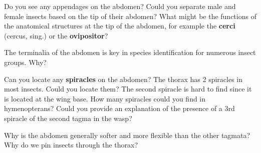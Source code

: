 \documentclass[letterpaper, 11pt]{article}
\begin{document}
\noindent{}Do you see any appendages on the abdomen? Could you separate male and female insects based on the tip of their abdomen? What might be the functions of the anatomical structures at the tip of the abdomen, for example the \textbf{cerci} (cercus, sing.) or the \textbf{ovipositor}? 
\vspace{30 mm}

\noindent{}The terminalia of the abdomen is key in species identification for numerous insect groups. Why? 
\vspace{30 mm}

\noindent{}Can you locate any \textbf{spiracles} on the abdomen? The thorax has 2 spiracles in most insects. Could you locate them? The second spiracle is hard to find since it is located at the wing base. How many spiracles could you find in hymenopterans? Could you provide an explanation of the presence of a 3rd spiracle of the second tagma in the wasp?
\vspace{30 mm}

\noindent{}Why is the abdomen generally softer and more flexible than the other tagmata? Why do we pin insects through the thorax?
\end{document}
